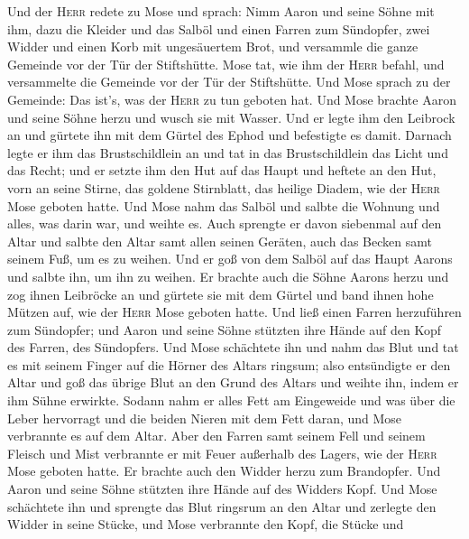  Und der \textsc{Herr} redete zu Mose und sprach:
 Nimm Aaron und seine Söhne mit ihm, dazu die Kleider und
das Salböl und einen Farren zum Sündopfer, zwei Widder und einen Korb
mit ungesäuertem Brot,  und versammle die ganze Gemeinde
vor der Tür der Stiftshütte.  Mose tat, wie ihm der
\textsc{Herr} befahl, und versammelte die Gemeinde vor der Tür der
Stiftshütte.  Und Mose sprach zu der Gemeinde: Das ist's,
was der \textsc{Herr} zu tun geboten hat.  Und Mose
brachte Aaron und seine Söhne herzu und wusch sie mit Wasser.
 Und er legte ihm den Leibrock an und gürtete ihn mit dem
Gürtel des Ephod und befestigte es damit.  Darnach legte
er ihm das Brustschildlein an und tat in das Brustschildlein das Licht
und das Recht;  und er setzte ihm den Hut auf das Haupt
und heftete an den Hut, vorn an seine Stirne, das goldene Stirnblatt,
das heilige Diadem, wie der \textsc{Herr} Mose geboten hatte.
 Und Mose nahm das Salböl und salbte die Wohnung und
alles, was darin war, und weihte es.  Auch sprengte er
davon siebenmal auf den Altar und salbte den Altar samt allen seinen
Geräten, auch das Becken samt seinem Fuß, um es zu weihen.
 Und er goß von dem Salböl auf das Haupt Aarons und
salbte ihn, um ihn zu weihen.  Er brachte auch die Söhne
Aarons herzu und zog ihnen Leibröcke an und gürtete sie mit dem Gürtel
und band ihnen hohe Mützen auf, wie der \textsc{Herr} Mose geboten
hatte.  Und ließ einen Farren herzuführen zum Sündopfer;
und Aaron und seine Söhne stützten ihre Hände auf den Kopf des Farren,
des Sündopfers.  Und Mose schächtete ihn und nahm das
Blut und tat es mit seinem Finger auf die Hörner des Altars ringsum;
also entsündigte er den Altar und goß das übrige Blut an den Grund des
Altars und weihte ihn, indem er ihm Sühne erwirkte. 
Sodann nahm er alles Fett am Eingeweide und was über die Leber
hervorragt und die beiden Nieren mit dem Fett daran, und Mose verbrannte
es auf dem Altar.  Aber den Farren samt seinem Fell und
seinem Fleisch und Mist verbrannte er mit Feuer außerhalb des Lagers,
wie der \textsc{Herr} Mose geboten hatte.  Er brachte
auch den Widder herzu zum Brandopfer. Und Aaron und seine Söhne stützten
ihre Hände auf des Widders Kopf.  Und Mose schächtete ihn
und sprengte das Blut ringsrum an den Altar  und zerlegte
den Widder in seine Stücke, und Mose verbrannte den Kopf, die Stücke und
